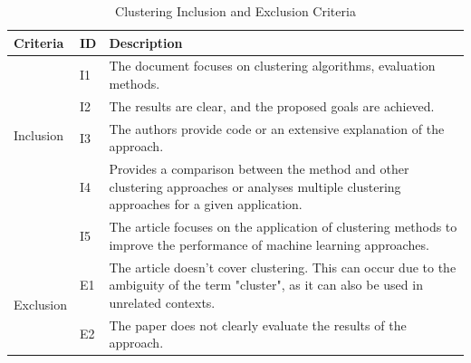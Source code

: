 \bgroup
\def\arraystretch{1.5}%
\begin{table}[]
    \caption{Clustering Inclusion and Exclusion Criteria}
    \label{tab:clustering_criteria}
    \begin{tabularx}{\textwidth}{llX}
    \hline
    \textbf{Criteria}             & \textbf{ID} & \textbf{Description}                                                                                                                                                                                                            \\ \hline
    \multirow{4}{*}{Inclusion}    & I1          & The document focuses on clustering algorithms, evaluation methods.                                                                                                                                                   \\
                                  & I2          & The results are clear, and the proposed goals are achieved.                                                                                                                                                                     \\
                                  & I3          & The authors provide code or an extensive explanation of the approach.                                                                                                                                                           \\
                                  & I4          & Provides a comparison between the method and other clustering approaches or analyses multiple clustering approaches for a given application.                                        \\
                                  & I5          & The article focuses on the application of clustering methods to improve  the performance of machine learning approaches.                                                             \\ \hline
    \multicolumn{1}{c}{\multirow{4}{*}{Exclusion}} & E1          & The article doesn't cover clustering. This can occur due to the ambiguity of the term "cluster", as it can also be used in unrelated contexts.                   \\
    \multicolumn{1}{c}{}          & E2          & The paper does not clearly evaluate the results of the approach.                                                                                                                                                                \\

\end{tabularx}
\end{table}
